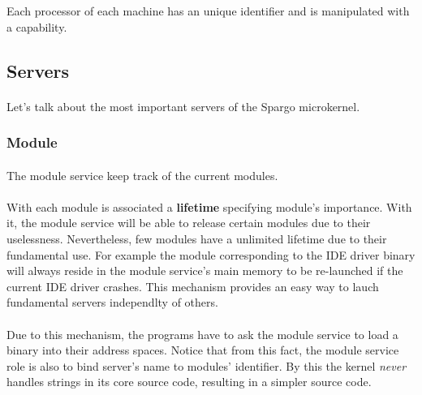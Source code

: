 \documentclass[10pt,a4wide]{article}
\begin{document}
\begin{multicols}{2}
Each processor of each machine has an unique identifier and is manipulated
with a capability.

\subsection{Servers}

\paragraph{}

Let's talk about the most important servers of the Spargo microkernel.

\subsubsection{Module}

\paragraph{}

The module service keep track of the current modules.

\paragraph{}

With each module is associated a \textbf{lifetime} specifying module's
importance. With it, the module service will be able to release certain
modules due to their uselessness. Nevertheless, few modules have a
unlimited lifetime due to their fundamental use. For example the module
corresponding to the IDE driver binary will always reside in the module
service's main memory to be re-launched if the current IDE driver crashes.
This mechanism provides an easy way to lauch fundamental servers independlty
of others.

\paragraph{}

Due to this mechanism, the programs have to ask the module service to load
a binary into their address spaces. Notice that from this fact, the module
service role is also to bind server's name to modules' identifier. By this
the kernel \textit{never} handles strings in its core source code, resulting
in a simpler source code.

\paragraph{}


\end{multicols}
\end{document}
